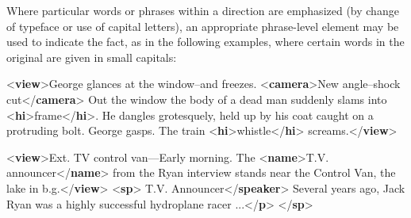 Where particular words or phrases within a direction are emphasized (by change of typeface or use of capital letters), an appropriate phrase-level element may be used to indicate the fact, as in the following examples, where certain words in the original are given in small capitals: \par\bgroup{}\exampleFont \begin{shaded}\noindent\mbox{}{<\textbf{view}>}George glances at the window--and freezes.\mbox{}\newline 
{<\textbf{camera}>}New angle--shock cut{</\textbf{camera}>} Out the window\mbox{}\newline 
 the body of a dead man suddenly slams into\mbox{}\newline 
{<\textbf{hi}>}frame{</\textbf{hi}>}. He dangles grotesquely,\mbox{}\newline 
 held up by his coat caught on a protruding bolt.\mbox{}\newline 
 George gasps. The train {<\textbf{hi}>}whistle{</\textbf{hi}>} screams.{</\textbf{view}>}\end{shaded}\egroup\par \noindent   \par\bgroup{}\exampleFont \begin{shaded}\noindent\mbox{}{<\textbf{view}>}Ext. TV control van—Early morning.\mbox{}\newline 
 The {<\textbf{name}>}T.V. announcer{</\textbf{name}>} from the Ryan interview\mbox{}\newline 
 stands near the Control Van, the lake in b.g.{</\textbf{view}>}\mbox{}\newline 
{<\textbf{sp}>}\mbox{}\newline 
{}T.V. Announcer{</\textbf{speaker}>}\mbox{}\newline 
{}Several years ago, Jack Ryan was a highly\mbox{}\newline 
\hspace*{1em}\hspace*{1em} successful hydroplane racer ...{</\textbf{p}>}\mbox{}\newline 
{</\textbf{sp}>}\end{shaded}\egroup\par \noindent  \par

